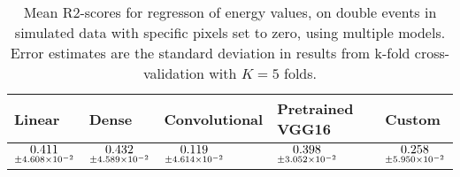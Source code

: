 \begin{table}
\centering
\caption{
Mean R2-scores for regresson of energy values, on double events in simulated data with specific pixels
set to zero, using multiple models. Error estimates are the standard deviation in results from k-fold 
cross-validation with $K=5$ folds.
}
\label{tab:regression-simulated-double-energy-pixelmod-r2}
\begin{tabular}{lllll}
\toprule
                                             Linear &                                               Dense &                                       Convolutional &                                    Pretrained VGG16 &                                              Custom \\
\midrule
 $\underset{\num{+- 4.608e-02 }  }{\num{ 0.411 } }$ &  $\underset{\num{+- 4.589e-02 }  }{\num{ 0.432 } }$ &  $\underset{\num{+- 4.614e-02 }  }{\num{ 0.119 } }$ &  $\underset{\num{+- 3.052e-02 }  }{\num{ 0.398 } }$ &  $\underset{\num{+- 5.950e-02 }  }{\num{ 0.258 } }$ \\
\bottomrule
\end{tabular}
\end{table}
